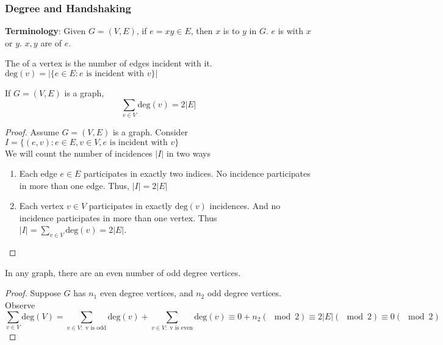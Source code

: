 \documentclass[11pt]{scrartcl}
\begin{document}
\subsubsection{Degree and Handshaking}
\begin{terminology}
    \textbf{Terminology}: Given $G=(V, E)$, if $e = xy \in E$, then $x$ is  to $y$ in $G$.  $e$ is  with $x$ or $y$.  $x,y$ are  of $e$.
\end{terminology}
\begin{definition}
    The  of a vertex is the number of edges incident with it.  $\text{deg}(v) = |\{e \in E : e \text{ is incident with } v\}|$
\end{definition}
\begin{theorem}[Handshaking]
    If $G = (V, E)$ is a graph, $$\sum_{v \in V} \text{deg}(v) = 2|E|$$
\end{theorem}
\begin{proof}
    Assume $G = (V, E)$ is a graph. Consider $I = \{(e, v) : e \in E, v \in V, e \text{ is incident with }v\}$\\
    We will count the number of incidences $|I|$ in two ways \begin{enumerate}
        \item Each edge $e \in E$ participates in exactly two indices. No incidence participates in more than one edge. Thus, $|I| = 2|E|$
        \item Each vertex $v \in V $ participates in exactly $\text{deg}(v)$ incidences.  And no incidence participates in more than one vertex.  Thus $|I| = \sum_{v \in V} \text{deg}(v) = 2|E|$.
    \end{enumerate}
\end{proof}
\begin{corollary}
    In any graph, there are an even number of odd degree vertices.
\end{corollary}
\begin{proof}
    Suppose $G$ has $n_1$ even degree vertices, and $n_2$ odd degree vertices.  Observe $$\sum_{v \in V } \text{deg}(V) = \sum_{v \in V  : \text{ v is odd}} \text{deg}(v) + \sum_{v \in V : \text{ v is even}} \text{deg}(v) \equiv 0 + n_2 (\mod 2) \equiv 2|E| (\mod 2) \equiv 0 (\mod 2)$$  
\end{proof}
\end{document}

